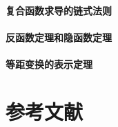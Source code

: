 \documentclass[zihao=-4,linespread=1.5,heading=true,a4paper,twoside]{ctexart}
\begin{document}
\subsection{复合函数求导的链式法则}


\subsection{反函数定理和隐函数定理}


\subsection{等距变换的表示定理}


%



\newpage\part*{参考文献}
\printbibliography[heading=none]
\end{document}
